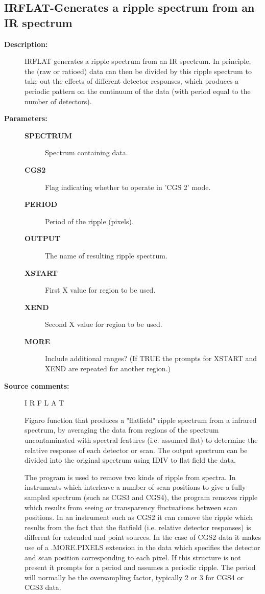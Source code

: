 \begin{description}
\subsection{IRFLAT-\label{IRFLAT}Generates a ripple spectrum from an IR spectrum}
\begin{description}

\item [\textbf{Description:}]
 IRFLAT generates a ripple spectrum from  an IR spectrum.
 In principle, the (raw or ratioed) data can then be divided
 by this ripple spectrum to take out the effects of different
 detector responses, which produces a periodic pattern on the
 continuum of the data (with period equal to the number of
 detectors).

\item [\textbf{Parameters:}]
\begin{description}
\item [\textbf{SPECTRUM}]
 Spectrum containing data.
\item [\textbf{CGS2}]
 Flag indicating whether to operate in 'CGS 2' mode.
\item [\textbf{PERIOD}]
 Period of the ripple (pixels).
\item [\textbf{OUTPUT}]
 The name of resulting ripple spectrum.
\item [\textbf{XSTART}]
 First X value for region to be used.
\item [\textbf{XEND}]
 Second X value for region to be used.
\item [\textbf{MORE}]
 Include additional ranges?  (If TRUE the prompts for XSTART and XEND
 are repeated for another region.)
\end{description}

\item [\textbf{Source comments:}]
\begin{terminalv}
 I R F L A T

 Figaro function that produces a "flatfield" ripple
 spectrum from a infrared  spectrum, by averaging the data from
 regions of the spectrum uncontaminated with spectral features
 (i.e. assumed flat) to determine the relative response of each
 detector or scan. The output spectrum can be divided into the original
 spectrum using IDIV to flat field the data.

 The program is used to remove two kinds of ripple from spectra.
 In instruments which interleave a number of scan positions to give
 a fully sampled spectrum (such as CGS3 and CGS4), the program removes
 ripple which results from seeing or transparency fluctuations between
 scan positions. In an instrument such as CGS2 it can remove the ripple
 which results from the fact that the flatfield (i.e. relative detector
 responses) is different for extended and point sources. In the case of
 CGS2 data it makes use of a .MORE.PIXELS extension in the data which
 specifies the detector and scan position corresponding to each pixel.
 If this structure is not present it prompts for a period and assumes
 a periodic ripple. The period will normally be the oversampling factor,
 typically 2 or 3 for CGS4 or CGS3 data.


\end{terminalv}
\end{description}
\end{description}

